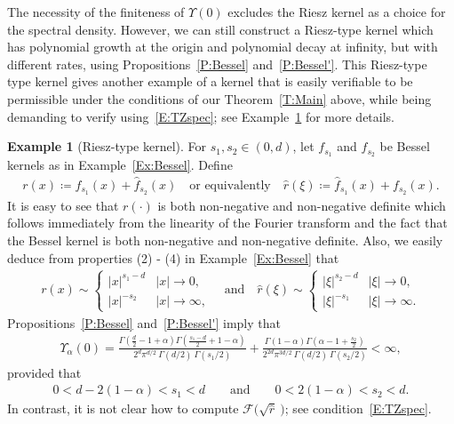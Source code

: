 \documentclass[a4paper,11pt]{article}%
\theoremstyle{plain}
\theoremstyle{definition}
\newtheorem{example}[theorem]{Example}
\numberwithin{equation}{section}
\begin{document}
The necessity of the finiteness of $\Upsilon(0)$ excludes the Riesz kernel as a choice for the
spectral density. However, we can still construct a Riesz-type kernel which has polynomial growth at
the origin and polynomial decay at infinity, but with different rates, using
Propositions~\ref{P:Bessel} and~\ref{P:Bessel'}. This Riesz-type type kernel gives another example
of a kernel that is easily verifiable to be permissible under the conditions of our
Theorem~\ref{T:Main} above, while being demanding to verify using~\eqref{E:TZspec}; see
Example~\ref{Ex:Riesz-T} for more details.

\begin{example}[Riesz-type kernel]\label{Ex:Riesz-T}
  For $s_1, s_2\in (0,d)$, let $f_{s_1}$ and $f_{s_2}$ be Bessel kernels as in
  Example~\ref{Ex:Bessel}. Define
  \begin{align*}
    r(x)\coloneqq f_{s_1}(x) + \widehat{f}_{s_2}(x) \quad \text{or equivalently} \quad
    \widehat{r}(\xi)\coloneqq \widehat{f}_{s_1}(x) + f_{s_2}(x).
  \end{align*}
  It is easy to see that $r(\cdot)$ is both non-negative and non-negative definite which follows
  immediately from the linearity of the Fourier transform and the fact that the Bessel kernel is
  both non-negative and non-negative definite. Also, we easily deduce from properties (2) - (4) in
  Example~\ref{Ex:Bessel} that
  \begin{align*}
    r(x) \sim
    \begin{cases}
      |x|^{s_1-d} & |x| \to 0, \\
      |x|^{-s_2}  & |x| \to \infty,
    \end{cases}
    \quad \text{and} \quad
    \widehat{r}(\xi) \sim
    \begin{cases}
      |\xi|^{s_2 - d} & |\xi| \to 0, \\
      |\xi|^{-s_1}    & |\xi| \to \infty.
    \end{cases}
  \end{align*}
  Propositions~\ref{P:Bessel} and~\ref{P:Bessel'} imply that
  \begin{align*}
    \Upsilon_{\alpha}(0) =
    \frac{\Gamma\left(\frac{d}{2} -1 + \alpha\right) \Gamma\left(\frac{s_1 -d}{2} + 1 - \alpha\right)}{2^d \pi^{d/2} \: \Gamma(d/2)\:\Gamma\left(s_1/2\right)}
    + \frac{\Gamma\left(1 - \alpha\right) \Gamma\left(\alpha - 1 + \frac{s_2}{2}\right)}{2^{2d} \pi^{3d/2} \: \Gamma(d/2) \: \Gamma\left(s_2 / 2\right)} < \infty,
  \end{align*}
  provided that
	\begin{align*}\label{E:RieszTypeCond}
    0 < d - 2(1-\alpha) < s_1 < d  \qquad \text{and} \qquad
    0 < 2(1-\alpha) < s_2 < d.
	\end{align*}
  In contrast, it is not clear how to compute $\mathcal{F}\big(\sqrt{\widehat{r}}\:\big)$; see
  condition~\eqref{E:TZspec}.
\end{example}
\end{document}
